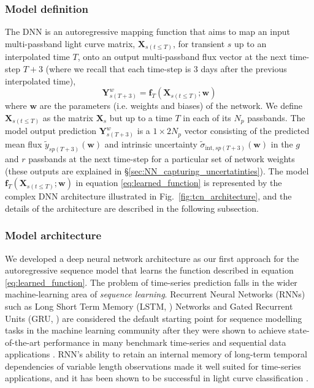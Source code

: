 \documentclass[fleqn,usenatbib]{mnras}
\begin{document}
\subsubsection{Model definition}
The DNN is an autoregressive mapping function that aims to map an input multi-passband light curve matrix, $\bm{X}_{s(t \le T)}$, for transient $s$ up to an interpolated time $T$, onto an output multi-passband flux vector at the next time-step $T+3$ (where we recall that each time-step is 3 days after the previous interpolated time),
\begin{equation}
    \bm{Y}^w_{s(T+3)} = \bm{f}_T(\bm{X}_{s(t\le T)}; \bm{w})
    \label{eq:learned_function}
\end{equation}
where $\bm{w}$ are the parameters (i.e. weights and biases) of the network. We define $\bm{X}_{s(t \le T)}$ as the matrix $\bm{X}_s$ but up to a time $T$ in each of its $N_p$ passbands. The model output prediction $\bm{Y}^w_{s(T+3)}$ is a $1 \times 2N_p$ vector consisting of the predicted mean flux $\tilde{y}_{sp(T+3)} (\bm{w})$ and intrinsic uncertainty $\tilde{\sigma}_{\mathrm{int},sp(T+3)}(\bm{w})$ in the $g$ and $r$ passbands at the next time-step for a particular set of network weights (these outputs are explained in \S\ref{sec:NN_capturing_uncertatinties}). The model $\bm{f}_T(\bm{X}_{s(t \le T)}; \bm{w})$ in equation \ref{eq:learned_function} is represented by the complex DNN architecture illustrated in Fig.~\ref{fig:tcn_architecture}, and the details of the architecture are described in the following subsection.

\subsubsection{Model architecture}
\label{sec:NN_Model_architecture}
We developed a deep neural network architecture as our first approach for the autoregressive sequence model that learns the function described in equation \ref{eq:learned_function}. The problem of time-series prediction falls in the wider machine-learning area of \textit{sequence learning}. Recurrent Neural Networks (RNNs) such as Long Short Term Memory (LSTM, \citealt{LSTM}) Networks and Gated Recurrent Units (GRU, \citealt{GRU}) are considered the default starting point for sequence modelling tasks in the machine learning community after they were shown to achieve state-of-the-art performance in many benchmark time-series and sequential data applications \citep[e.g.][]{Pascanu2014,Chung2014,Sutskever2014SequenceNetworks,Jozefowicz2015,Zhang2015,Bahdanau2014NeuralTranslate,Che2018RecurrentValues}. RNN's ability to retain an internal memory of long-term temporal dependencies of variable length observations made it well suited for time-series applications, and it has been shown to be successful in light curve classification \citep[e.g.][]{Charnock2016,Moss2018,Muthukrishna19RAPID,SupernnoovaMoller2019,Martinez2020,JamalBloom2020}. 
\end{document}
